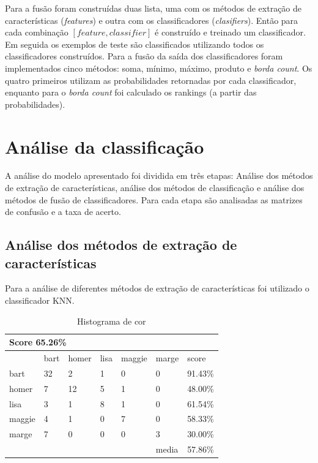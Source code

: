 \documentclass[paper=a4, fontsize=11pt]{scrartcl} %
\numberwithin{equation}{section} %
\numberwithin{figure}{section} %
\numberwithin{table}{section} %
\begin{document}
Para a fusão foram construídas duas lista, uma com os métodos de extração de características ({\it features}) e outra com os classificadores ({\it clasifiers}).
Então para cada combinação $[feature, classifier]$ é construído e treinado um classificador.
Em seguida os exemplos de teste são classificados utilizando todos os classificadores construídos.
Para a fusão da saída dos classificadores foram implementados cinco métodos: soma, mínimo, máximo, produto e {\it borda count}.
Os quatro primeiros utilizam as probabilidades retornadas por cada classificador, 
enquanto para o {\it borda count} foi calculado os rankings (a partir das probabilidades).

\section {Análise da classificação}

A análise do modelo apresentado foi dividida em três etapas: Análise dos métodos de extração de características, análise dos métodos de classificação e análise dos métodos de fusão de classificadores. Para cada etapa são analisadas as matrizes de confusão e a taxa de acerto.

\subsection {Análise dos métodos de extração de características}

Para a análise de diferentes métodos de extração de características foi utilizado o classificador KNN.

\begin{table}[!htb]
\centering
\caption{Histograma de cor}
\label{tbl:colorhistogram}
\begin{tabular}{|l|l|l|l|l|l|l|}
\hline
\multicolumn{7}{|l|}{\textbf{Score 65.26\%}}                                          \\ \hline
            & bart      & homer      & lisa      & maggie     & marge    & score      \\ \hline
bart        & 32        & 2          & 1         & 0          & 0        & 91.43\%    \\ \hline
homer       & 7         & 12         & 5         & 1          & 0        & 48.00\%    \\ \hline
lisa        & 3         & 1          & 8         & 1          & 0        & 61.54\%    \\ \hline
maggie      & 4         & 1          & 0         & 7          & 0        & 58.33\%    \\ \hline
marge       & 7         & 0          & 0         & 0          & 3        & 30.00\%    \\ \hline
            &           &            &           &            & media    & 57.86\%    \\ \hline
\end{tabular}
\end{table}
\end{document}
